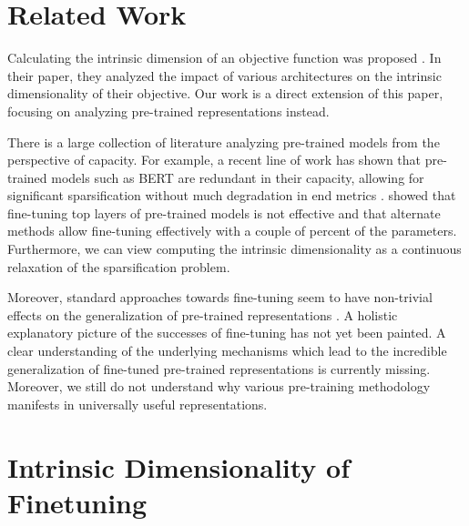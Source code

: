\documentclass{article} \usepackage{iclr2020_conference,times}
\begin{document}
\section{Related Work}
Calculating the intrinsic dimension of an objective function was proposed \cite{intrinsic_dimension}. In their paper, they analyzed the impact of various architectures on the intrinsic dimensionality of their objective. Our work is a direct extension of this paper, focusing on analyzing pre-trained representations instead.

There is a large collection of literature analyzing pre-trained models from the perspective of capacity. For example, a recent line of work has shown that pre-trained models such as BERT are redundant in their capacity, allowing for significant sparsification without much degradation in end metrics \citep{bert_lottery_ticket, bert_lottery_all_winners, hongyuan_lotter_ticket}. \cite{adapter_network} showed that fine-tuning top layers of pre-trained models is not effective and that alternate methods allow fine-tuning effectively with a couple of percent of the parameters. Furthermore, we can view computing the intrinsic dimensionality as a continuous relaxation of the sparsification problem.

Moreover, standard approaches towards fine-tuning seem to have non-trivial effects on the generalization of pre-trained representations \citep{RXF}. A holistic explanatory picture of the successes of fine-tuning has not yet been painted. A clear understanding of the underlying mechanisms which lead to the incredible generalization of fine-tuned pre-trained representations is currently missing. Moreover, we still do not understand why various pre-training methodology manifests in universally useful representations.



\section{Intrinsic Dimensionality of Finetuning}
\end{document}
